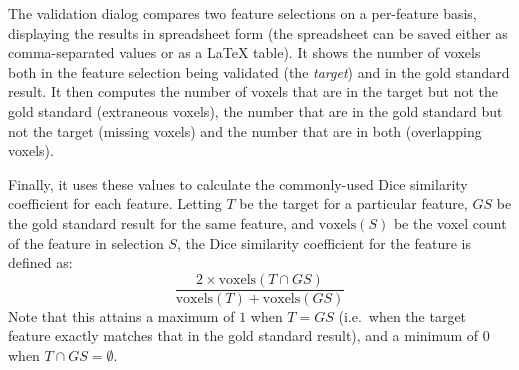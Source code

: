 The validation dialog compares two feature selections on a per-feature basis, displaying the results in spreadsheet form (the spreadsheet can be saved either as comma-separated values or as a \LaTeX{} table). It shows the number of voxels both in the feature selection being validated (the \emph{target}) and in the gold standard result. It then computes the number of voxels that are in the target but not the gold standard (extraneous voxels), the number that are in the gold standard but not the target (missing voxels) and the number that are in both (overlapping voxels).

\newpage

\noindent Finally, it uses these values to calculate the commonly-used Dice similarity coefficient for each feature. Letting $T$ be the target for a particular feature, $\mathit{GS}$ be the gold standard result for the same feature, and $\mbox{voxels}(S)$ be the voxel count of the feature in selection $S$, the Dice similarity coefficient for the feature is defined as:
%
\[
\frac{2 \times \mbox{voxels}(T \cap \mathit{GS})}{\mbox{voxels}(T) + \mbox{voxels}(\mathit{GS})}
\]
%
Note that this attains a maximum of $1$ when $T = \mathit{GS}$ (i.e.~when the target feature exactly matches that in the gold standard result), and a minimum of $0$ when $T \cap \mathit{GS} = \emptyset$.

